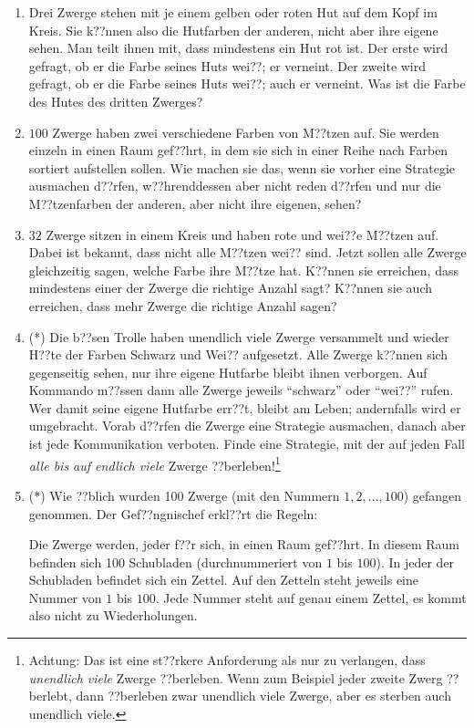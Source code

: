 \documentclass[a4paper,ngerman,12pt]{zirkelblatt1415}
\theoremstyle{definition}
\theoremstyle{plain}
\theoremstyle{remark}
\begin{document}
\begin{enumerate}

  \item Drei Zwerge stehen mit je einem gelben oder roten Hut auf dem Kopf im Kreis. Sie k??nnen also die Hutfarben der anderen, nicht aber ihre eigene sehen. Man teilt ihnen mit, dass mindestens ein Hut rot ist. Der erste wird gefragt, ob er die Farbe seines Huts wei??; er verneint. Der zweite wird gefragt, ob er die Farbe seines Huts wei??; auch er verneint. Was ist die Farbe des Hutes des dritten Zwerges?
  \item $100$ Zwerge haben zwei verschiedene Farben von M??tzen auf. Sie werden einzeln in einen Raum gef??hrt, in dem sie sich in einer Reihe nach Farben sortiert aufstellen sollen. Wie machen sie das, wenn sie vorher eine Strategie ausmachen d??rfen, w??hrenddessen aber nicht reden d??rfen und nur die M??tzenfarben der anderen, aber nicht ihre eigenen, sehen?
  \item $32$ Zwerge sitzen in einem Kreis und haben rote und wei??e M??tzen auf. Dabei ist bekannt, dass nicht alle M??tzen wei?? sind. Jetzt sollen alle Zwerge gleichzeitig sagen, welche Farbe ihre M??tze hat. K??nnen sie erreichen, dass mindestens einer der Zwerge die richtige Anzahl sagt? K??nnen sie auch erreichen, dass mehr Zwerge die richtige Anzahl sagen?
  \item (*) Die b??sen Trolle haben unendlich viele Zwerge versammelt und wieder H??te der Farben Schwarz und Wei?? aufgesetzt. Alle Zwerge k??nnen sich gegenseitig sehen, nur ihre eigene Hutfarbe bleibt ihnen verborgen. Auf Kommando m??ssen dann alle Zwerge jeweils "`schwarz"' oder "`wei??"' rufen. Wer damit seine eigene Hutfarbe err??t, bleibt am Leben; andernfalls wird er umgebracht. Vorab d??rfen die Zwerge eine Strategie ausmachen, danach aber ist jede Kommunikation verboten. Finde eine Strategie, mit der auf jeden Fall \emph{alle bis auf endlich viele} Zwerge ??berleben!\footnote{Achtung: Das ist eine st??rkere Anforderung als nur zu verlangen, dass \emph{unendlich viele} Zwerge ??berleben. Wenn zum Beispiel jeder zweite Zwerg ??berlebt, dann ??berleben zwar unendlich viele Zwerge, aber es sterben auch unendlich viele.}
  \item (*) Wie ??blich wurden 100 Zwerge (mit den Nummern $1, 2, \ldots, 100$) gefangen genommen. Der Gef??ngnischef erkl??rt die Regeln:

Die Zwerge werden, jeder f??r sich, in einen Raum gef??hrt. In diesem Raum befinden sich 100 Schubladen (durchnummeriert von $1$ bis $100$). In jeder der Schubladen befindet sich ein Zettel. Auf den Zetteln steht jeweils eine Nummer von $1$ bis $100$. Jede Nummer steht auf genau einem Zettel, es kommt also nicht zu Wiederholungen.


\end{enumerate}
\end{document}
